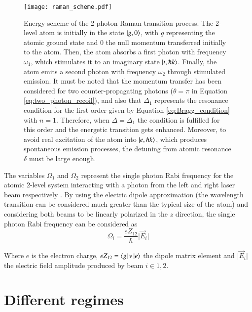 \begin{figure}[!htbp]\centering
	\texttt{[image: raman\_scheme.pdf]}
	\caption[Energy scheme of the 2-photon Raman transition process]{Energy scheme of the 2-photon Raman transition process. The 2-level atom is initially in the state $\ket{g, 0}$, with $g$ representing the atomic ground state and 0 the null momentum transferred initially to the atom. Then, the atom absorbs a first photon with frequency $\omega_1$, which stimulates it to an imaginary state $\ket{i, \hbar k}$. Finally, the atom emits a second photon with frequency $\omega_2$ through stimulated emission. It must be noted that the momentum transfer has been considered for two counter-propagating photons ($\theta=\pi$ in Equation \eqref{eq:two_photon_recoil}), and also that $\Delta_1$ represents the resonance condition for the first order given by Equation \eqref{eq:Bragg_condition} with $n=1$. Therefore, when $\Delta = \Delta_1$ the condition is fulfilled for this order and the energetic transition gets enhanced. Moreover, to avoid real excitation of the atom into $\ket{e, \hbar k}$, which produces spontaneous emission processes, the detuning from atomic resonance $\delta$ must be large enough. }\label{fig:raman_scheme}
\end{figure}

The variables $\Omega_1$ and $\Omega_2$ represent the single photon Rabi frequency for the atomic 2-level system interacting with a photon from the left and right laser beam respectively \cite{Foot2005}. By using the electric dipole approximation (the wavelength transition can be considered much greater than the typical size of the atom) and considering both beams to be linearly polarized in the $z$ direction, the single photon Rabi frequency can be considered as
\begin{equation}
	\Omega_i = \frac{eZ_{12}}{\hbar} \mathopen|\vec{E}_{i}\mathclose|
\end{equation} 

Where $e$ is the electron charge, $eZ_{12}=\bra{g}\nu\ket{e}$ the dipole matrix element and $\mathopen|\vec{E}_{i}\mathclose|$ the electric field amplitude produced by beam $i\in {1,2}$.

\newpage

\section{Different regimes}

\cite{Giltner1995}

